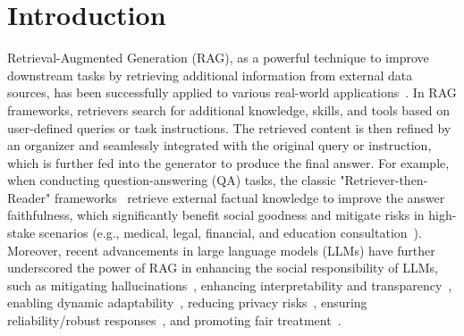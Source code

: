 \vspace{-2ex}
\section{Introduction}\label{sec-intro}
\vspace{-1ex}
Retrieval-Augmented Generation (RAG), as a powerful technique to improve downstream tasks by retrieving additional information from external data sources, has been successfully applied to various real-world applications~\cite{ding2024survey, gao2023retrieval, zeng2024towards, zhao2024retrieval}. In RAG frameworks, retrievers search for additional knowledge, skills, and tools based on user-defined queries or task instructions. The retrieved content is then refined by an organizer and seamlessly integrated with the original query or instruction, which is further fed into the generator to produce the final answer. For example, when conducting question-answering (QA) tasks, the classic "Retriever-then-Reader" frameworks~\cite{ju2022grape, karpukhin2020dense, xiong2020answering, zhu2021retrieving} retrieve external factual knowledge to improve the answer faithfulness, which significantly benefit social goodness and mitigate risks in high-stake scenarios (e.g., medical, legal,  financial, and education consultation~\cite{xiong2024benchmarking, xu2024ram, zhang2023enhancing}). Moreover, recent advancements in large language models (LLMs) have further underscored the power of RAG in enhancing the social responsibility of LLMs, such as mitigating hallucinations~\cite{tonmoy2024comprehensive}, enhancing interpretability and transparency~\cite{kim2024re}, enabling dynamic adaptability~\cite{shi2024retrieval, wang2023knowledge}, reducing privacy risks~\cite{zeng2024mitigating, zeng2024good}, ensuring reliability/robust responses~\cite{fang2024enhancing, xiang2024certifiably}, and promoting fair treatment~\cite{shrestha2024fairrag}.


